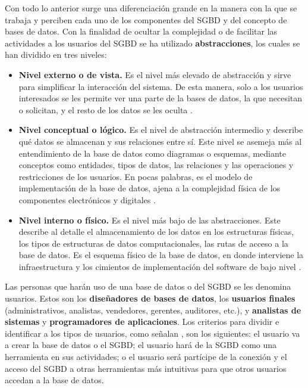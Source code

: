 \documentclass[12pt]{article}
\begin{document}

Con todo lo anterior surge una diferenciación grande en la manera con la que se trabaja y perciben cada uno de los componentes del SGBD y del concepto de bases de datos. Con la finalidad de ocultar la complejidad o de facilitar las actividades a los usuarios del SGBD se ha utilizado \textbf{abstracciones}, los cuales se han dividido en tres niveles:

\begin{itemize}
	\item \textbf{Nivel externo o de vista.} Es el nivel más elevado de abstracción y sirve para simplificar la interacción del sistema. De esta manera, solo a los usuarios interesados se les permite ver una parte de la bases de datos, la que necesitan o solicitan, y el resto de los datos se les oculta \parencite{Silberschatz2014, Elmasri2007}.
	\item \textbf{Nivel conceptual o lógico.} Es el nivel de abstracción intermedio y describe qué datos se almacenan y sus relaciones entre sí. Este nivel se asemeja más al entendimiento de la base de datos como diagramas o esquemas, mediante conceptos como entidades, tipos de datos, las relaciones y las operaciones y restricciones de los usuarios. En pocas palabras, es el modelo de implementación de la base de datos, ajena a la complejidad física de los componentes electrónicos y digitales \parencite{Silberschatz2014, Elmasri2007}.
	\item \textbf{Nivel interno o físico.} Es el nivel más bajo de las abstracciones. Este describe al detalle el almacenamiento de los datos en los estructuras físicas, los tipos de estructuras de datos computacionales, las rutas de acceso a la base de datos. Es el esquema físico de la base de datos, en donde interviene la infraestructura y los cimientos de implementación del software de bajo nivel \parencite{Silberschatz2014, Elmasri2007}.
\end{itemize}


Las personas que harán uso de una base de datos o del SGBD se les denomina usuarios. Estos son los \textbf{diseñadores de bases de datos}, los \textbf{usuarios finales} (administrativos, analistas, vendedores, gerentes, auditores, etc.), y \textbf{analistas de sistemas} y \textbf{programadores de aplicaciones}. Los criterios para dividir e identificar a los tipos de usuarios, como señalan \textcite{Elmasri2007, Silberschatz2014}, son los siguientes: el usuario va a crear la base de datos o el SGBD; el usuario hará de la SGBD como una herramienta en sus actividades; o el usuario será partícipe de la conexión y el acceso del SGBD a otras herramientas más intuitivas para que otros usuarios accedan a la base de datos.
\newline
\end{document}
